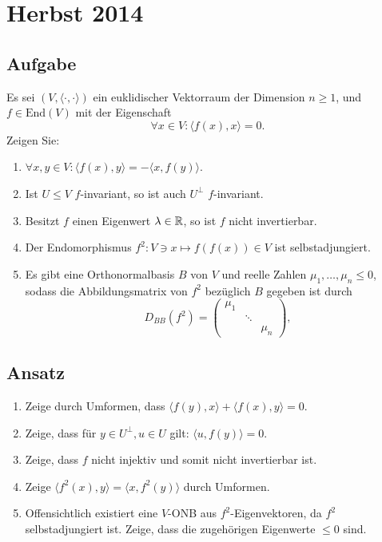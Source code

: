 \newpage

\section{Herbst 2014}

\subsection{Aufgabe}
Es sei \( (V,\langle \cdot, \cdot \rangle) \) ein euklidischer Vektorraum der Dimension \( n \geq 1 \), und \( f \in \text{End}(V) \) mit der Eigenschaft
\begin{equation*}
	\forall x \in V: \langle f(x),x \rangle = 0\text{.}
\end{equation*}
Zeigen Sie:
\begin{enumerate}
	\item \( \forall x,y \in V : \langle f(x),y \rangle = -\langle x,f(y) \rangle \).
	\item Ist \( U \leq V \) \( f \)-invariant, so ist auch \( U^\perp \) \( f \)-invariant.
	\item Besitzt \( f \) einen Eigenwert \( \lambda \in \mathbb{R} \), so ist \( f \) nicht invertierbar.
	\item Der Endomorphismus \( f^2: V \ni x \mapsto f(f(x)) \in V \) ist selbstadjungiert.
	\item Es gibt eine Orthonormalbasis \( B \) von \( V \) und reelle Zahlen \( \mu_1, \dots, \mu_n \leq 0 \), sodass die Abbildungsmatrix von \( f^2 \) bezüglich \( B \) gegeben ist durch
	\begin{equation*}
	 	D_{BB}(f^2) = \begin{pmatrix}
	 		\mu_1 & & \\
	 		& \ddots & \\
	 		& & \mu_n
	 	\end{pmatrix}\text{,}
	 \end{equation*} 
\end{enumerate}

\subsection{Ansatz}
\begin{enumerate}
	\item Zeige durch Umformen, dass \( \langle f(y),x \rangle + \langle f(x),y \rangle = 0 \).
	\item Zeige, dass für \( y \in U^\perp, u \in U \) gilt: \( \langle u,f(y) \rangle = 0 \).
	\item Zeige, dass \( f \) nicht injektiv und somit nicht invertierbar ist.
	\item Zeige \( \langle f^2(x),y \rangle = \langle x,f^2(y) \rangle \) durch Umformen.
	\item Offensichtlich existiert eine \( V \)-ONB aus \( f^2 \)-Eigenvektoren, da \( f^2 \) selbstadjungiert ist. Zeige, dass die zugehörigen Eigenwerte \( \leq 0 \) sind.
\end{enumerate}

